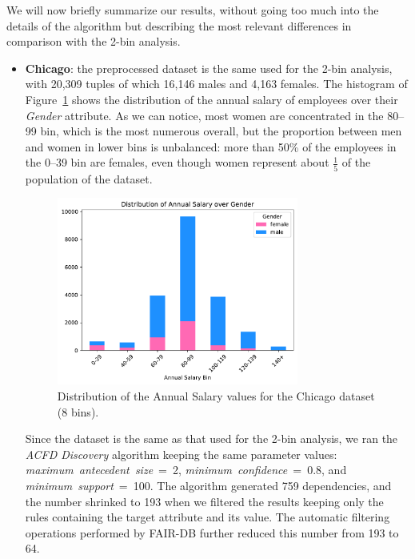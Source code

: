 We will now briefly summarize our results, without going too much into the details of the algorithm but describing the most relevant differences in comparison with the 2-bin analysis.

\begin{itemize}
\item \textbf{Chicago}: the preprocessed dataset is the same used for the 2-bin analysis, with 20,309 tuples of which 16,146 males and 4,163 females. The histogram of Figure~\ref{fig:chicago_8bins_fair-db1} shows the distribution of the annual salary of employees over their \textit{Gender} attribute. As we can notice, most women are concentrated in the 80--99 bin, which is the most numerous overall, but the proportion between men and women in lower bins is unbalanced: more than 50\% of the employees in the 0--39 bin are females, even though women represent about \(\frac{1}{5}\) of the population of the dataset.

\begin{figure}[t!]
\centering
\includegraphics[width=0.75\textwidth]{figures/chicago_annual_salary_over_gender.pdf}
\caption{Distribution of the \textrm{Annual Salary} values for the Chicago dataset (8 bins).}
\label{fig:chicago_8bins_fair-db1}
\end{figure}

Since the dataset is the same as that used for the 2-bin analysis, we ran the \textit{ACFD Discovery} algorithm keeping the same parameter values: \textit{maximum~antecedent~size}~=~2, \textit{minimum~confidence}~=~0.8, and \textit{minimum~support}~=~100. The algorithm generated 759 dependencies, and the number shrinked to 193 when we filtered the results keeping only the rules containing the target attribute and its value. The automatic filtering operations performed by FAIR-DB further reduced this number from 193 to 64.


\end{itemize}
